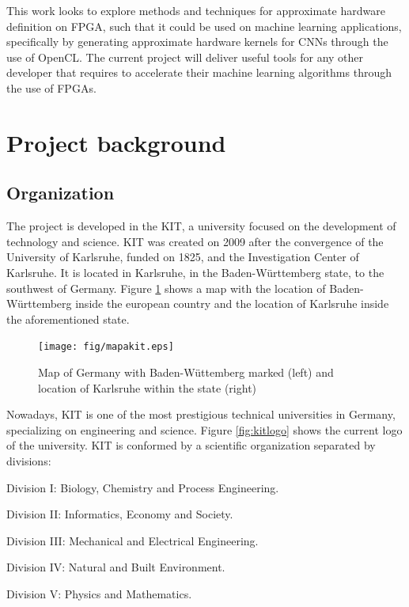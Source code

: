 This work looks to explore methods and techniques for approximate hardware definition on FPGA, such that
it could be used on machine learning applications, specifically by generating approximate hardware
kernels for CNNs through the use of OpenCL. The current project will deliver useful tools for any 
other developer that requires to accelerate their machine learning algorithms through the use of FPGAs.

\section{Project background}

\subsection{Organization}

The project is developed in the KIT, a university focused on the development of technology and science.
KIT was created on 2009 after the convergence of the University of Karlsruhe, funded on 1825, and the 
Investigation Center of Karlsruhe. It is located in Karlsruhe, in the Baden-Württemberg state, to the
southwest of Germany. Figure \ref{fig:mapakit} shows a map with the location of Baden-Württemberg inside the european
country and the location of Karlsruhe inside the aforementioned state.

\begin{figure}[H]
    \texttt{[image: fig/mapakit.eps]}
    \caption{Map of Germany with Baden-Wüttemberg marked (left) \cite{badenmap} and location of Karlsruhe within the state (right) \cite{karlsmap}}
    \label{fig:mapakit}
\end{figure}

Nowadays, KIT is one of the most prestigious technical universities in Germany, specializing on engineering
and science. Figure \ref{fig:kitlogo} shows the current logo of the university. KIT is conformed by a scientific organization
separated by divisions:

\begin{compactitem}
    \item Division I: Biology, Chemistry and Process Engineering.
    \item Division II: Informatics, Economy and Society.
    \item Division III: Mechanical and Electrical Engineering.
    \item Division IV: Natural and Built Environment.
    \item Division V: Physics and Mathematics.
\end{compactitem}

